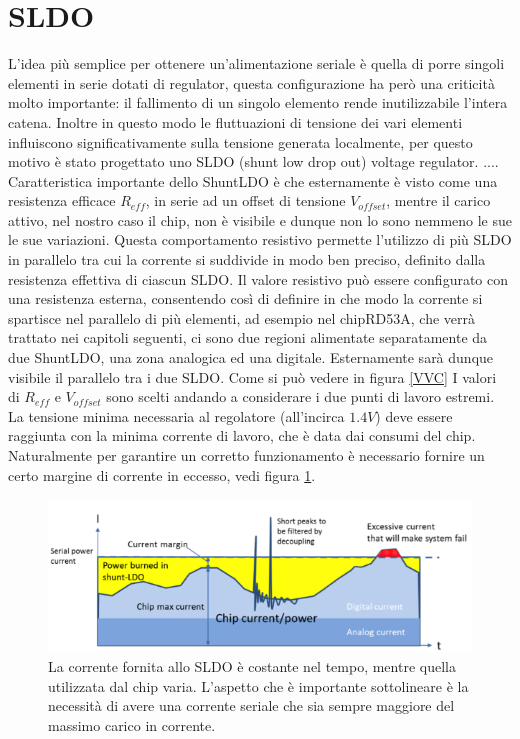 \section{SLDO}
L'idea più semplice per ottenere un'alimentazione seriale è quella di porre singoli elementi in serie dotati di regulator, questa configurazione ha però una criticità molto importante: il fallimento di un singolo elemento rende inutilizzabile l'intera catena. 
Inoltre in questo modo le fluttuazioni di tensione dei vari elementi influiscono significativamente  sulla tensione generata localmente, per questo motivo è stato progettato uno SLDO (shunt low drop out) voltage regulator.
....
% 
Caratteristica importante dello ShuntLDO è che esternamente è visto come una resistenza efficace $R_{eff}$, in serie ad un offset di tensione $V_{offset}$, mentre il carico attivo, nel nostro caso il chip, non è visibile e dunque non lo sono nemmeno le sue le sue variazioni. 
Questa comportamento resistivo permette l'utilizzo di più SLDO in parallelo tra cui la corrente si suddivide in modo ben preciso, definito dalla resistenza effettiva di ciascun SLDO. 
Il valore resistivo può essere configurato con una resistenza esterna, consentendo così di definire in che modo la corrente si spartisce nel parallelo di più elementi, ad esempio nel chipRD53A, che verrà trattato nei capitoli seguenti, ci sono due regioni alimentate separatamente da due ShuntLDO, una zona analogica ed una digitale. Esternamente sarà dunque visibile il parallelo tra i due SLDO. 
Come si può vedere in figura \ref{VVC} I valori di $R_{eff}$ e $V_{offset}$ sono scelti andando a considerare i due punti di lavoro estremi. La tensione minima necessaria al regolatore (all'incirca $1.4V$) deve essere raggiunta con la minima corrente di lavoro, che è data dai consumi del chip. Naturalmente per garantire un corretto funzionamento è necessario fornire un certo margine di corrente in eccesso, vedi figura \ref{SLDOprinciple}. 
\begin{figure}
\centering
\includegraphics[scale=.5]{Immagini/ShuntRegulatorPrinciple}
\caption{La corrente fornita allo SLDO è costante nel tempo, mentre quella utilizzata dal chip varia. L'aspetto che è importante sottolineare è la necessità di avere una corrente seriale che sia sempre maggiore del massimo carico in corrente.}
\label{SLDOprinciple}
\end{figure}
